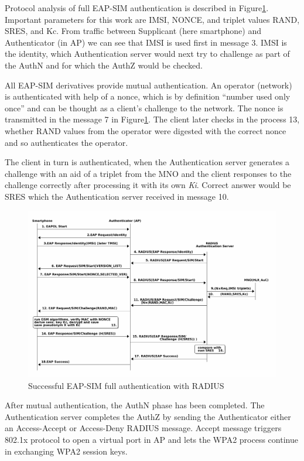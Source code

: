 \documentclass[12pt,a4paper,english]{tutthesis}
\begin{document}
\begin{otherlanguage}{english}
Protocol analysis of full EAP-SIM authentication is described 
in Figure\ref{fig:eap-sim-radius}.
Important parameters for this work are IMSI, NONCE, and triplet values
RAND, SRES, and Kc. 
From traffic between Supplicant (here smartphone) and Authenticator (in AP)
we can see that IMSI is used first in message 3. IMSI is the
identity, which Authentication server would next try to challenge as
part of the AuthN and for which the AuthZ would be checked.







All EAP-SIM derivatives provide mutual authentication.
An operator (network) is authenticated with help of a nonce,
which is by definition ``number used only once'' and can
be thought as a client's challenge to the network.
The nonce is transmitted in the message 7 in Figure\ref{fig:eap-sim-radius}.
The client later checks in the process 13, whether RAND values from
the operator were digested with the correct nonce and so authenticates
the operator.

The client in turn is authenticated, when the Authentication server
generates a challenge with an aid of a triplet from the MNO and the
client responses to the challenge correctly after processing it with
its own \emph{Ki}.  Correct answer would be SRES which the Authentication
server received in message 10.
\begin{figure}[htb]
\centering
\includegraphics[width=.9\linewidth]{eap-sim-radius.png}
\caption{\label{fig:eap-sim-radius}Successful EAP-SIM full authentication with RADIUS}
\end{figure}



After mutual authentication, the AuthN phase has been completed. The
Authentication server completes the AuthZ by sending the Authenticator either
an Access-Accept or Access-Deny RADIUS message. 
Accept message triggers 802.1x protocol to open a virtual port in AP
and lets the WPA2 process continue in exchanging WPA2 session keys. 


\end{otherlanguage}
\end{document}
